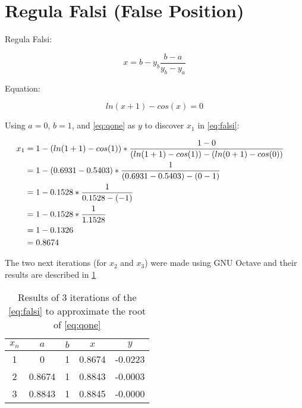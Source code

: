 \section{Regula Falsi (False Position)}
	
	Regula Falsi:
	
	\begin{equation}
		x = b - y_{b}\frac{b-a}{y_{b}-y_{a}}
	\label{eq:falsi}
	\end{equation}
	
	Equation:
	
	\begin{equation}
		ln(x+1) - cos(x) = 0
	\label{eq:qone}
	\end{equation}
	
	Using $a = 0$, $b = 1$, and \cref{eq:qone} as $y$ to discover $x_{1}$ in \cref{eq:falsi}:
	
	\begin{align}
		x_{1} &= 1 - \left( ln(1+1) - cos(1) \right)*\frac{1-0}{\left( ln(1+1) - cos(1) \right) - \left( ln(0+1) - cos(0) \right)}& \notag \\
		&= 1 - \left( 0.6931 - 0.5403 \right)*\frac{1}{\left( 0.6931 - 0.5403 \right) - \left( 0 - 1 \right)}& \notag \\
		&= 1 - 0.1528*\frac{1}{0.1528 - (-1)}& \notag \\
		&= 1 - 0.1528 *\frac{1}{1.1528}& \notag \\
		&= 1 - 0.1326& \notag \\
		&= 0.8674&
		\label{eq:qonexone}
	\end{align}

	The two next iterations (for $x_{2}$ and $x_{3}$) were made using GNU Octave and their results are described in \cref{tab:qone}

	\begin{table}[H]
		\begin{center}
			\begin{tabular}{|c||c|c||c|c|}
				\hline
				\textbf{$x_{n}$} & \textbf{$a$} & \textbf{$b$} & \textbf{$x$} & \textbf{$y$} \\ \hline
				1 & 0 & 1 & 0.8674 & -0.0223 \\ \hline
				2 & 0.8674 & 1 & 0.8843 & -0.0003 \\ \hline
				3 & 0.8843 & 1 & 0.8845 & -0.0000 \\ \hline
			\end{tabular}
			\caption{Results of 3 iterations of the \cref{eq:falsi} to approximate the root of \cref{eq:qone}}
			\label{tab:qone}
		\end{center}
	\end{table}